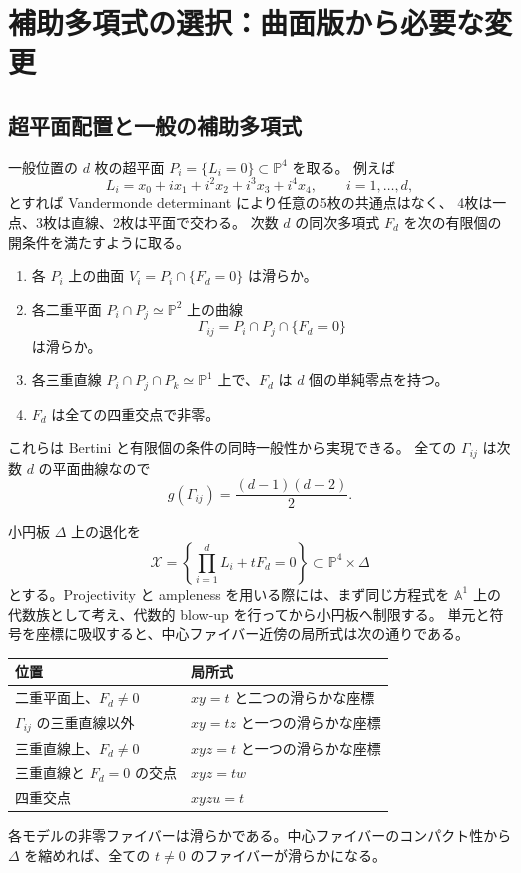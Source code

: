 \documentclass[11pt,a4paper]{article}
\theoremstyle{definition}
\newcommand{\PP}{\mathbb P}
\newcommand{\cX}{\mathcal X}
\begin{document}
\section{補助多項式の選択：曲面版から必要な変更}\label{sec:pencil}

\subsection{超平面配置と一般の補助多項式}

一般位置の $d$ 枚の超平面 $P_i=\{L_i=0\}\subset\PP^4$ を取る。
例えば
\[
L_i=x_0+i x_1+i^2x_2+i^3x_3+i^4x_4,\qquad i=1,\ldots,d,
\]
とすれば Vandermonde determinant により任意の5枚の共通点はなく、
4枚は一点、3枚は直線、2枚は平面で交わる。
次数 $d$ の同次多項式 $F_d$ を次の有限個の開条件を満たすように取る。
\begin{enumerate}
\item 各 $P_i$ 上の曲面 $V_i=P_i\cap\{F_d=0\}$ は滑らか。
\item 各二重平面 $P_i\cap P_j\simeq\PP^2$ 上の曲線
\[
\Gamma_{ij}=P_i\cap P_j\cap\{F_d=0\}
\]
は滑らか。
\item 各三重直線 $P_i\cap P_j\cap P_k\simeq\PP^1$ 上で、$F_d$ は $d$ 個の単純零点を持つ。
\item $F_d$ は全ての四重交点で非零。
\end{enumerate}
これらは Bertini と有限個の条件の同時一般性から実現できる。
全ての $\Gamma_{ij}$ は次数 $d$ の平面曲線なので
\begin{equation}\label{eq:genus}
g(\Gamma_{ij})=\frac{(d-1)(d-2)}2.
\end{equation}

小円板 $\Delta$ 上の退化を
\begin{equation}\label{eq:family}
\cX=\left\{\prod_{i=1}^dL_i+tF_d=0\right\}
\subset\PP^4\times\Delta
\end{equation}
とする。Projectivity と ampleness を用いる際には、まず同じ方程式を
$\mathbb A^1$ 上の代数族として考え、代数的 blow-up を行ってから小円板へ制限する。
単元と符号を座標に吸収すると、中心ファイバー近傍の局所式は次の通りである。
\begin{center}
\begin{tabularx}{\linewidth}{@{}lX@{}}
\toprule
位置 & 局所式\\
\midrule
二重平面上、$F_d\ne0$ & $xy=t$ と二つの滑らかな座標\\
$\Gamma_{ij}$ の三重直線以外 & $xy=tz$ と一つの滑らかな座標\\
三重直線上、$F_d\ne0$ & $xyz=t$ と一つの滑らかな座標\\
三重直線と $F_d=0$ の交点 & $xyz=tw$\\
四重交点 & $xyzu=t$\\
\bottomrule
\end{tabularx}
\end{center}
各モデルの非零ファイバーは滑らかである。中心ファイバーのコンパクト性から
$\Delta$ を縮めれば、全ての $t\ne0$ のファイバーが滑らかになる。
\end{document}
